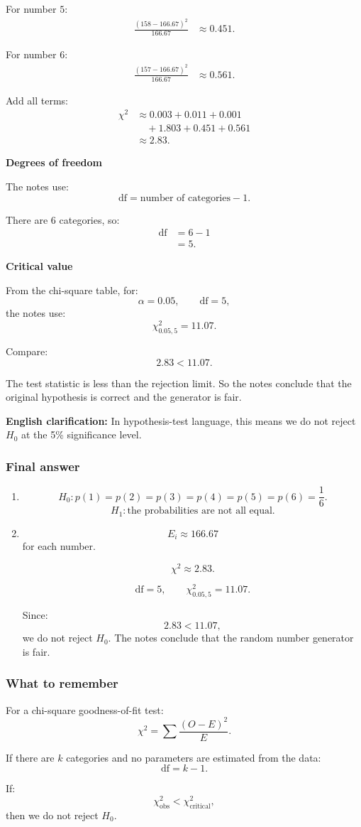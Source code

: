 \documentclass[10pt]{article}
\begin{document}
For number \(5\):
\begin{align*}
\frac{(158-166.67)^2}{166.67}
&\approx 0.451.
\end{align*}

For number \(6\):
\begin{align*}
\frac{(157-166.67)^2}{166.67}
&\approx 0.561.
\end{align*}

Add all terms:
\begin{align*}
\chi^2
&\approx
0.003+0.011+0.001
\\
&\quad
+1.803+0.451+0.561
\\[2mm]
&\approx 2.83.
\end{align*}

\textbf{Degrees of freedom}

The notes use:
\[
\text{df}
=
\text{number of categories}-1.
\]

There are 6 categories, so:
\begin{align*}
\text{df}
&=
6-1
\\[2mm]
&=5.
\end{align*}

\textbf{Critical value}

From the chi-square table, for:
\[
\alpha=0.05,
\qquad
\text{df}=5,
\]
the notes use:
\[
\chi^2_{0.05,5}=11.07.
\]

Compare:
\[
2.83<11.07.
\]

The test statistic is less than the rejection limit.
So the notes conclude that the original hypothesis is
correct and the generator is fair.

\textbf{English clarification:}
In hypothesis-test language, this means we do not
reject \(H_0\) at the 5\% significance level.

\subsubsection*{Final answer}

\begin{enumerate}[label=\alph*)]
\item
\[
H_0:
p(1)=p(2)=p(3)=p(4)=p(5)=p(6)
=\frac{1}{6}.
\]
\[
H_1:
\text{the probabilities are not all equal.}
\]

\item
\[
E_i\approx 166.67
\]
for each number.

\[
\chi^2\approx 2.83.
\]

\[
\text{df}=5,
\qquad
\chi^2_{0.05,5}=11.07.
\]

Since:
\[
2.83<11.07,
\]
we do not reject \(H_0\). The notes conclude that
the random number generator is fair.
\end{enumerate}

\subsubsection*{What to remember}

For a chi-square goodness-of-fit test:
\[
\chi^2
=
\sum
\frac{(O-E)^2}{E}.
\]

If there are \(k\) categories and no parameters are
estimated from the data:
\[
\text{df}=k-1.
\]

If:
\[
\chi^2_{\text{obs}}
<
\chi^2_{\text{critical}},
\]
then we do not reject \(H_0\).
\end{document}
